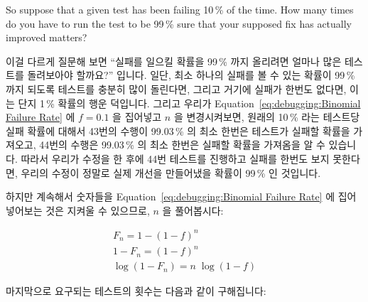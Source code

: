 So suppose that a given test has been failing 10\,\% of the time.
How many times do you have to run the test to be 99\,\% sure that
your supposed fix has actually improved matters?
\fi

이걸 다르게 질문해 보면 ``실패를 일으킬 확률을 99\,\% 까지 올리려면 얼마나 많은
테스트를 돌려보아야 할까요?'' 입니다.
일단, 최소 하나의 실패를 볼 수 있는 확률이 99\,\% 까지 되도록 테스트를 충분히
많이 돌린다면, 그리고 거기에 실패가 한번도 없다면, 이는 단지 1\,\% 확률의 행운
덕입니다.
그리고 우리가
Equation~\ref{eq:debugging:Binomial Failure Rate} 에 $f=0.1$ 을 집어넣고 $n$ 을
변경시켜보면, 원래의 10\,\% 라는 테스트당 실패 확률에 대해서 43번의 수행이
99.03\,\% 의 최소 한번은 테스트가 실패할 확률을 가져오고, 44번의 수행은
99.03\,\% 의 최소 한번은 실패할 확률을 가져옴을 알 수 있습니다.
따라서 우리가 수정을 한 후에 44번 테스트를 진행하고 실패를 한번도 보지
못한다면, 우리의 수정이 정말로 실제 개선을 만들어냈을 확률이 99\,\% 인
것입니다.

하지만 계속해서 숫자들을
Equation~\ref{eq:debugging:Binomial Failure Rate}
에 집어넣어보는 것은 지켜울 수 있으므로, $n$ 을 풀어봅시다:

\begin{eqnarray}
	F_n = 1-\left(1-f\right)^n \\
	1 - F_n = \left(1-f\right)^n \\
	\log \left(1 - F_n\right) = n \; \log \left(1 - f\right)
\end{eqnarray}

마지막으로 요구되는 테스트의 횟수는 다음과 같이 구해집니다:
\iffalse

